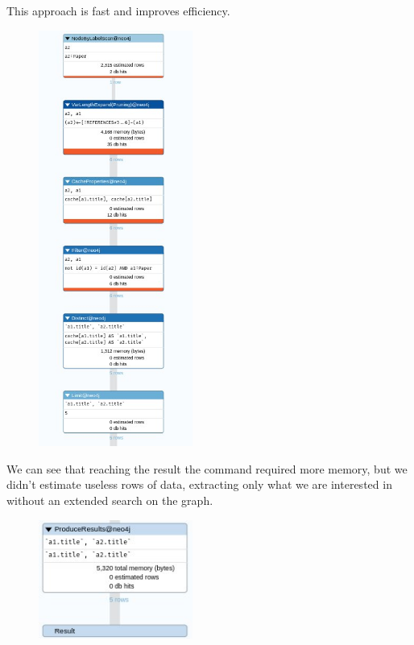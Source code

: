 \begin{enumerate}
    This approach is fast and improves efficiency.
    \begin{figure}[H]
        \begin{center}
            \includegraphics[width=0.45\textwidth]{Images/profile_query8neo4j2}
            \label{fig:profile_query8neo4j2}%
        \end{center}
    \end{figure}
    We can see that reaching the result the command required more memory, but we didn't estimate useless rows of data, extracting only what we are interested in without an extended search on the graph.
    \begin{figure}[H]
        \begin{center}
            \includegraphics[width=0.45\textwidth]{Images/result_query8neo4j2}

\end{center}
\end{figure}
\end{enumerate}
